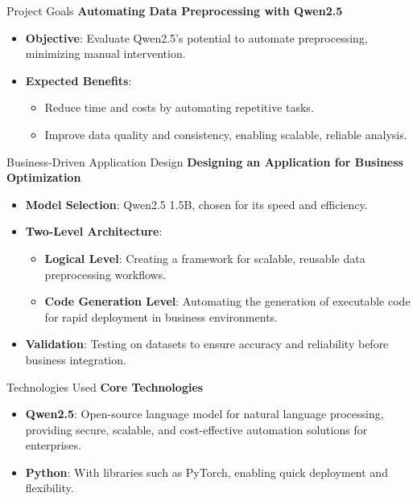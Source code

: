 \documentclass{beamer}
\begin{document}
\begin{frame}{Project Goals}
    \textbf{\textcolor{myBlue}{Automating Data Preprocessing with Qwen2.5}}
    \vspace{0.3cm}
    \begin{itemize}
        \item \textbf{Objective}: Evaluate Qwen2.5's potential to automate preprocessing, minimizing manual intervention.
        \item \textbf{\textcolor{myAccent}{Expected Benefits}}:
        \begin{itemize}
            \item Reduce time and costs by automating repetitive tasks.
            \item Improve data quality and consistency, enabling scalable, reliable analysis.
        \end{itemize}
    \end{itemize}
\end{frame}



\begin{frame}{Business-Driven Application Design}
    \textbf{\textcolor{myBlue}{Designing an Application for Business Optimization}}
    \vspace{0.3cm}
    \begin{itemize}
        \item \textbf{Model Selection}: Qwen2.5 1.5B, chosen for its speed and efficiency.
        \item \textbf{Two-Level Architecture}:
            \begin{itemize}
                \item \textbf{Logical Level}: Creating a framework for scalable, reusable data preprocessing workflows.
                \item \textbf{Code Generation Level}: Automating the generation of executable code for rapid deployment in business environments.
            \end{itemize}
        \item \textbf{Validation}: Testing on datasets to ensure accuracy and reliability before business integration.
    \end{itemize}
\end{frame}

\begin{frame}{Technologies Used}
    \textbf{\textcolor{myBlue}{Core Technologies}}
    \vspace{0.3cm}
    \begin{itemize}
        \item \textbf{Qwen2.5}: Open-source language model for natural language processing, providing secure, scalable, and cost-effective automation solutions for enterprises.
        \item \textbf{Python}: With libraries such as PyTorch, enabling quick deployment and flexibility.
    \end{itemize}
\end{frame}
\end{document}
